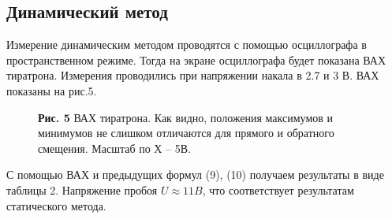 \documentclass[a4paper, 12pt]{article}%
\begin{document}
	\subsection*{Динамический метод}
	Измерение динамическим методом проводятся с помощью осциллографа в пространственном режиме. Тогда на экране осциллографа будет показана ВАХ тиратрона. Измерения проводились при напряжении накала в 2.7 и 3 В. ВАХ показаны на рис.5.
\begin{figure}[h]
\textbf{Рис. 5} ВАХ тиратрона. Как видно, положения максимумов и минимумов не слишком отличаются для прямого и обратного смещения. Масштаб по Х -- 5В.\\
\begin{minipage}[h]{0.43\linewidth}
\end{minipage}
\hfill
\begin{minipage}[h]{0.43\linewidth}
\end{minipage}
\end{figure}
\newpage
	С помощью ВАХ и предыдущих формул (9), (10) получаем результаты в виде таблицы 2. Напряжение пробоя $U \approx 11 B$, что соответствует результатам статического метода.
	
\end{document}
